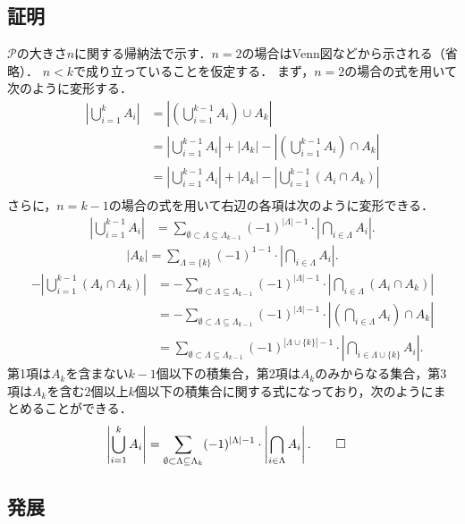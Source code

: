 \documentclass{jsarticle}
\begin{document}
\subsection{証明}
$\mathcal{P}$の大きさ$n$に関する帰納法で示す．$n=2$の場合はVenn図などから示される（省略）．
$n<k$で成り立っていることを仮定する．
まず，$n=2$の場合の式を用いて次のように変形する．
\begin{align*}
  \left|\bigcup_{i=1}^k A_i\right| &= \left|\left(\bigcup_{i=1}^{k-1} A_i\right)\cup A_k\right|\\
  &= \left|\bigcup_{i=1}^{k-1} A_i\right| + |A_k| - \left|\left(\bigcup_{i=1}^{k-1} A_i\right)\cap A_k\right|\\
  &= \left|\bigcup_{i=1}^{k-1} A_i\right| + |A_k| - \left|\bigcup_{i=1}^{k-1} (A_i\cap A_k)\right|\\
\end{align*}
さらに，$n=k-1$の場合の式を用いて右辺の各項は次のように変形できる．
\begin{align*}
  \left|\bigcup_{i=1}^{k-1} A_i\right|
  &= \sum_{\emptyset\subset\Lambda\subseteq\Lambda_{k-1}} (-1)^{|\Lambda|-1} \cdot\left|\bigcap_{i\in\Lambda} A_i\right|.
\end{align*}
\begin{align*}
  |A_k| = \sum_{\Lambda=\{k\}} (-1)^{1-1} \cdot\left|\bigcap_{i\in\Lambda} A_i\right|.
\end{align*}
\begin{align*}
  -\left|\bigcup_{i=1}^{k-1} (A_i\cap A_k)\right|
  &= -\sum_{\emptyset\subset\Lambda\subseteq\Lambda_{k-1}} (-1)^{|\Lambda|-1} \cdot\left|\bigcap_{i\in\Lambda} (A_i\cap A_k)\right|\\
  &= -\sum_{\emptyset\subset\Lambda\subseteq\Lambda_{k-1}} (-1)^{|\Lambda|-1} \cdot\left|\left(\bigcap_{i\in\Lambda} A_i\right)\cap A_k\right|\\
  &= \sum_{\emptyset\subset\Lambda\subseteq\Lambda_{k-1}} (-1)^{|\Lambda\cup\{k\}|-1} \cdot\left|\bigcap_{i\in\Lambda\cup\{k\}} A_i\right|.
\end{align*}
第1項は$A_k$を含まない$k-1$個以下の積集合，第2項は$A_k$のみからなる集合，第3項は$A_k$を含む$2$個以上$k$個以下の積集合に関する式になっており，次のようにまとめることができる．
\begin{align*}
  \left|\bigcup_{i=1}^k A_i\right|
  &= \sum_{\emptyset\subset\Lambda\subseteq\Lambda_k} (-1)^{|\Lambda|-1} \cdot\left|\bigcap_{i\in\Lambda} A_i\right|.\qed
\end{align*}

\subsection{発展}
\end{document}
